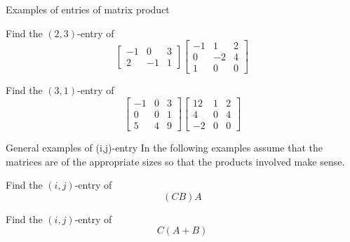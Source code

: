 \documentclass{beamer}
\begin{document}
\begin{frame}{Examples of entries of matrix product}
    \begin{example}
      Find the $(2,3)$-entry of 
      \[ 
        \left[
          \begin{array}{rrr}
            -1 & 0 & 3 \\
            {2} & {-1} & {1}
          \end{array}
        \right]
        \left[
          \begin{array}{rrr}
            -1 & 1 & {2} \\
            0 & -2 & {4} \\
            1 & 0 & {0}
          \end{array}\right] 
      \]
    \end{example}
        \begin{example}
      Find the $(3,1)$-entry of 
      \[ 
        \left[
          \begin{array}{rrr}
            -1 & 0 & 3 \\
            0 & 0 & {1}\\
            5 & 4 & 9
          \end{array}
        \right]
        \left[
          \begin{array}{rrr}
            12 & 1 & {2} \\
            4 & 0 & {4} \\
            -2 & 0 & {0}
          \end{array}\right] 
      \]
  \end{example}
\end{frame}

\begin{frame}{General examples of (i,j)-entry}
  In the following examples assume that the matrices are of the appropriate sizes so that the products involved make sense.\vfill
  \begin{example}
    Find the $(i,j)$-entry of
    \begin{equation*}
      (CB)A
    \end{equation*}
  \end{example}\vfill
  \begin{example}
    Find the $(i,j)$-entry of
    \begin{equation*}
      C(A+B)
    \end{equation*}
  \end{example}
\end{frame}
\end{document}
